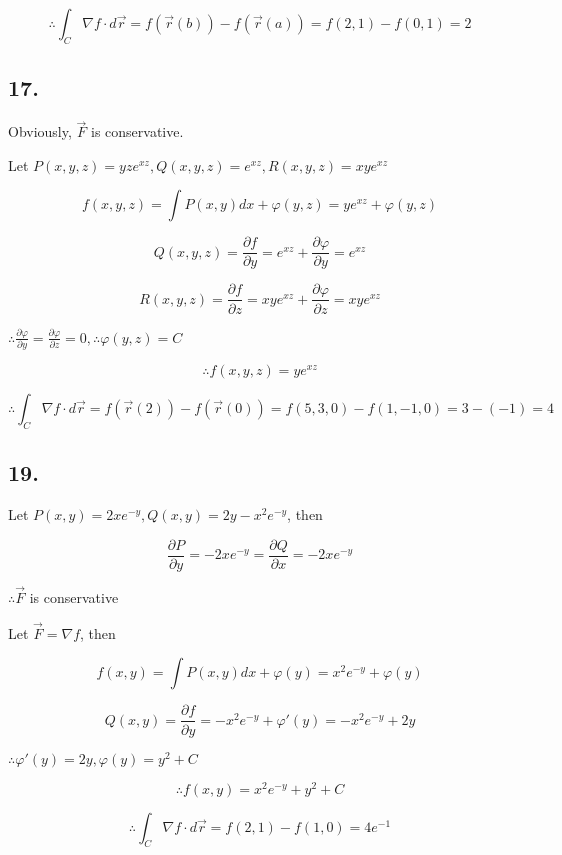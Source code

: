 \documentclass{article}
\begin{document}
  $$\therefore \int_C \nabla f \cdot d\overrightarrow{r} = f(\overrightarrow{r}(b)) -f(\overrightarrow{r}(a)) = f(2, 1) - f(0, 1) = 2$$

  \subsection*{17. }

  Obviously, $\overrightarrow{F}$ is conservative.

  Let $P(x, y, z) = yze^{xz}, Q(x, y, z) = e^{xz}, R(x, y, z) = xye^{xz}$

  $$f(x, y, z) = \int P(x, y) dx + \varphi(y, z) = ye^{xz} + \varphi(y, z)$$

  $$Q(x, y, z) = \frac{\partial f}{\partial y} = e^{xz} + \frac{\partial \varphi}{\partial y} = e^{xz}$$
 
  $$R(x, y, z) = \frac{\partial f}{\partial z} = xye^{xz} + \frac{\partial \varphi}{\partial z} = xye^{xz}$$

  $\therefore \frac{\partial \varphi}{\partial y} = \frac{\partial \varphi}{\partial z} = 0, \therefore \varphi(y, z) = C$

  $$\therefore f(x, y, z) = ye^{xz}$$

  $$\therefore \int_C \nabla f \cdot d\overrightarrow{r} = f(\overrightarrow{r}(2)) - f(\overrightarrow{r}(0)) = f(5, 3, 0) - f(1, -1, 0) = 3 - (-1) = 4$$

  \subsection*{19. }

  Let $P(x, y) = 2xe^{-y}, Q(x, y) = 2y - x^2e^{-y}$, then

  $$\frac{\partial P}{\partial y} = -2xe^{-y} = \frac{\partial Q}{\partial x} = -2xe^{-y}$$

  $\therefore \overrightarrow{F}$ is conservative

  Let $\overrightarrow{F} = \nabla f$, then

  $$f(x, y) = \int P(x, y) dx + \varphi(y) = x^2e^{-y} + \varphi(y)$$

  $$Q(x, y) = \frac{\partial f}{\partial y} = -x^2e^{-y} + \varphi'(y) = -x^2e^{-y} + 2y$$

  $\therefore \varphi'(y) = 2y, \varphi(y) = y^2 + C$

  $$\therefore f(x, y) = x^2e^{-y} + y^2 + C$$

  $$\therefore \int_C \nabla f \cdot d\overrightarrow{r} = f(2, 1) - f(1, 0) = 4e^{-1}$$
\end{document}
